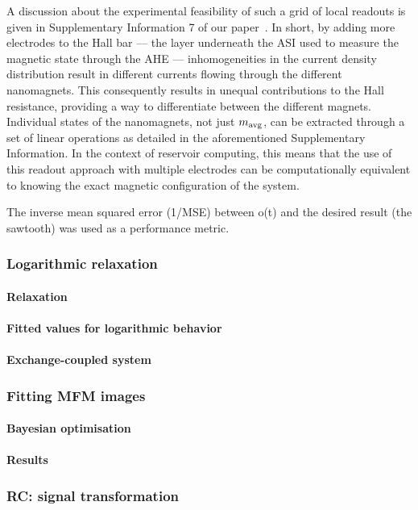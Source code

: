 A discussion about the experimental feasibility of such a grid of local readouts is given in Supplementary Information 7 of our paper~\cite{KUR-24}.
In short, by adding more electrodes to the Hall bar --- the layer underneath the ASI used to measure the magnetic state through the AHE --- inhomogeneities in the current density distribution result in different currents flowing through the different nanomagnets.
This consequently results in unequal contributions to the Hall resistance, providing a way to differentiate between the different magnets.
Individual states of the nanomagnets, not just $m_\mathrm{avg}$, can be extracted through a set of linear operations as detailed in the aforementioned Supplementary Information.
In the context of reservoir computing, this means that the use of this readout approach with multiple electrodes can be computationally equivalent to knowing the exact magnetic configuration of the system. \par
The inverse mean squared error (1/MSE) between o(t) and the desired result (the sawtooth) was used as a performance metric.

\subsubsection{Logarithmic relaxation}
\paragraph{Relaxation}
\paragraph{Fitted values for logarithmic behavior}
\paragraph{Exchange-coupled system} %
\subsubsection{Fitting MFM images}\label{sec:3:OOP:MFM}
\paragraph{Bayesian optimisation}
\paragraph{Results} %
\subsubsection{RC: signal transformation}
